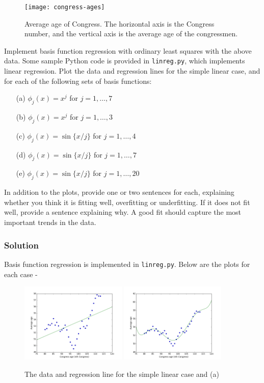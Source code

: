 \documentclass[submit]{harvardml}
\begin{document}
\begin{figure}[h]
\centering
\texttt{[image: congress-ages]}
\caption{Average age of Congress.  The horizontal axis is the Congress number, and the vertical axis is the average age of the congressmen.}
\label{fig:congress}
\end{figure}

\begin{problem}
Implement basis function regression with ordinary least squares with the above
data. Some sample Python code is provided in \verb|linreg.py|, which implements
linear regression.  Plot the data and regression lines for the simple linear
case, and for each of the following sets of basis functions:
\begin{itemize}
  \item[(a)] $\phi_j(x) = x^j$ for $j=1, \ldots, 7$
  \item[(b)] $\phi_j(x) = x^j$ for $j=1, \ldots, 3$
  \item[(c)] $\phi_j(x) = \sin\{ x / j \}$ for $j=1, \ldots, 4$
  \item[(d)] $\phi_j(x) = \sin\{ x / j \}$ for $j=1, \ldots, 7$
  \item[(e)] $\phi_j(x) = \sin\{ x / j \}$ for $j=1, \ldots, 20$
\end{itemize}
  In addition to the plots, provide one or two sentences for each, explaining
  whether you think it is fitting well, overfitting or underfitting.  If it does
  not fit well, provide a sentence explaining why. A good fit should capture the
  most important trends in the data.
  \end{problem}

\subsubsection*{Solution}
 Basis function regression is implemented in \verb|linreg.py|. Below are the plots for each case - 

\begin{figure}[h]
\centering
\includegraphics[width=0.45\textwidth]{congress-ages-polynomial-1}
\includegraphics[width=0.45\textwidth]{congress-ages-polynomial-7}
\caption{The data and regression line for the simple linear case and (a)}
\end{figure}
\end{document}
